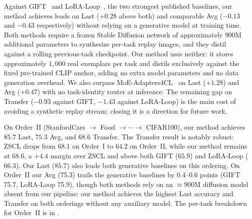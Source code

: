\documentclass{article}
\begin{document}
  Against GIFT~\citep{gift2025} and LoRA-Loop~\citep{loraloop2025}, the two
  strongest published baselines, our method achieves leads on Last ($+0.28$
  above both) and comparable Avg ($-0.13$ and $-0.43$ respectively) without
  relying on a generative model at training time. Both methods require a frozen
  Stable Diffusion network of approximately $900$M additional parameters to
  synthesize per-task replay images, and they distil against a rolling
  previous-task checkpoint. Our method uses neither: it stores approximately
  $1{,}000$ real exemplars per task and distils exclusively against the fixed
  pre-trained CLIP anchor, adding no extra model parameters and no data generation
  overhead. We also surpass MoE-Adapters4CL~\citep{yu2024moe} on Last ($+1.28$)
  and Avg ($+0.47$) with no task-identity router at inference. The remaining gap
  on Transfer ($-0.93$ against GIFT, $-1.43$ against LoRA-Loop) is the main cost
  of avoiding a synthetic replay stream; closing it is a direction for future work.

  On Order~II (StanfordCars $\to$ Food $\to \cdots \to$ CIFAR100), our method
  achieves $85.7$ Last, $75.3$ Avg, and $68.6$ Transfer. The Transfer result is notably robust: ZSCL drops from $68.1$ on Order~I to $64.2$ on Order~II, while
  our method remains at $68.6$, a $+4.4$ margin over ZSCL and above both GIFT ($65.9$) and LoRA-Loop ($66.3$). Our Last ($85.7$) also leads both generative
  baselines on this ordering. On Order~II our Avg (75.3) trails the generative baselines by 0.4--0.6 points (GIFT 75.7, LoRA-Loop 75.9), though both methods rely on an ${\approx}900$M diffusion model absent from our pipeline; our method achieves the highest Last accuracy and Transfer on both orderings without any auxiliary model. The per-task breakdown for Order~II is in
  .
\end{document}
